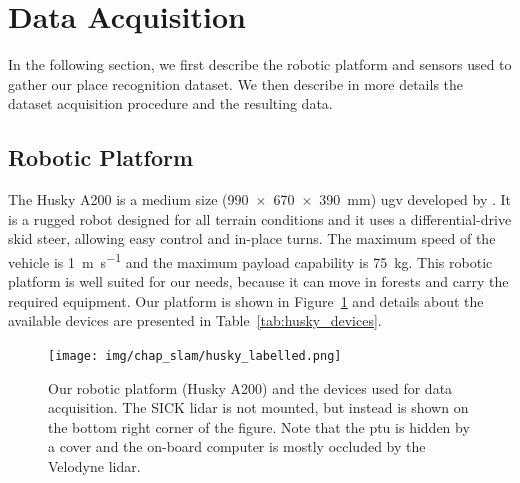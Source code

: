 \section{Data Acquisition}
\label{sec:chap_slam_data_acquisition}

In the following section, we first describe the robotic platform and sensors used to gather our place recognition dataset. We then describe in more details the dataset acquisition procedure and the resulting data.


\subsection{Robotic Platform}
\label{ssec:chap_slam_platform}

The Husky A200 is a medium size (\SI{990 x 670 x 390}{\milli\meter}) \gls*{ugv} developed by \cite{ClearpathWeb}. It is a rugged robot designed for all terrain conditions and it uses a differential-drive skid steer, allowing easy control and in-place turns. The maximum speed of the vehicle is \SI{1}{\meter\per\second} and the maximum payload capability is \SI{75}{\kilo\gram}. This robotic platform is well suited for our needs, because it can move in forests and carry the required equipment. Our platform is shown in Figure~\ref{fig:chap_slam_husky} and details about the available devices are presented in Table~\ref{tab:husky_devices}. 

\begin{figure}
    \centering
    \texttt{[image: img/chap\_slam/husky\_labelled.png]}
    \caption[Our robotic platform (Husky A200) and the devices used for data acquisition.]{Our robotic platform (Husky A200) and the devices used for data acquisition. The SICK \gls*{lidar} is not mounted, but instead is shown on the bottom right corner of the figure. Note that the \gls*{ptu} is hidden by a cover and the on-board computer is mostly occluded by the Velodyne \gls*{lidar}.}
    \label{fig:chap_slam_husky}
\end{figure}

